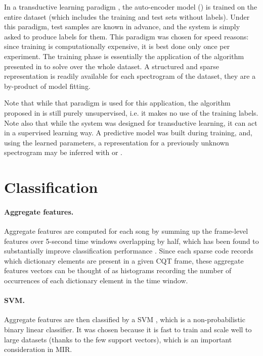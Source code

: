 In a transductive learning paradigm \cite{vapnik1998transductiveLearning}, the auto-encoder model () is trained on the entire dataset (which includes the training and test sets without labels). Under this paradigm, test samples are known in advance, and the system is simply asked to produce labels for them. This paradigm was chosen for speed reasons: since training is computationally expensive, it is best done only once per experiment. The training phase is essentially the application of the algorithm presented in  to solve  over the whole dataset. A structured and sparse representation is readily available for each spectrogram of the dataset, they are a by-product of model fitting.

Note that while that paradigm is used for this application, the algorithm proposed in  is still purely unsupervised, i.e. it makes no use of the training labels.
Note also that while the system was designed for transductive learning, it can act in a supervised learning way. A predictive model was built during training, and, using the learned parameters, a representation for a previously unknown spectrogram may be inferred with  or .

\section{Classification}

\paragraph{Aggregate features.}
Aggregate features are computed for each song by summing up the frame-level features over 5-second time windows overlapping by half, which has been found to substantially improve classification performance \cite{bergstra2006aggregateFeatures, hamel2010aggregateFeatures}. Since each sparse code records which dictionary elements are present in a given \gls{CQT} frame, these aggregate features vectors can be thought of as histograms recording the number of occurrences of each dictionary element in the time window.

\paragraph{\gls{SVM}.}
Aggregate features are then classified by a \gls{SVM} \cite{cortes1995SVM}, which is a non-probabilistic binary linear classifier. It was chosen because it is fast to train and scale well to large datasets (thanks to the few support vectors), which is an important consideration in \gls{MIR}.

